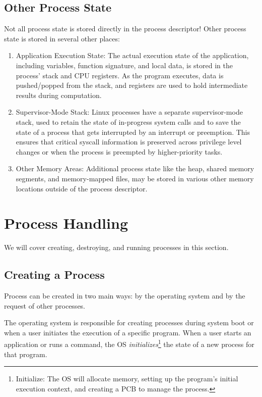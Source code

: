 \documentclass{report}
\begin{document}
\section{Other Process State}
Not all process state is stored directly in the process descriptor! Other process state is stored in
several other places:
\begin{enumerate}[label=\textit{(\roman*)}]
\item Application Execution State: The actual execution state of the application, including
  variables, function signature, and local data, is stored in the process' stack and CPU
  registers. As the program executes, data is pushed/popped from the stack, and registers are used
  to hold intermediate results during computation.
\item Supervisor-Mode Stack: Linux processes have a separate supervisor-mode stack, used to retain
  the state of in-progress system calls and to save the state of a process that gets interrupted
  by an interrupt or preemption. This ensures that critical syscall information is preserved
  across privilege level changes or when the process is preempted by higher-priority tasks.
\item Other Memory Areas: Additional process state like the heap, shared memory segments, and
  memory-mapped files, may be stored in various other memory locations outside of the process
  descriptor.
\end{enumerate}


\chapter{Process Handling}
We will cover creating, destroying, and running processes in this section.

\section{Creating a Process}
Process can be created in two main ways: by the operating system and by the request of other
processes.

The operating system is responsible for creating processes during system boot or when a user
initiates the execution of a specific program. When a user starts an application or runs a command,
the OS \textit{initializes}\footnote{Initialize: The OS will allocate memory, setting up the program's
  initial execution context, and creating a PCB to manage the process.} the state of a new process
for that program. 
\end{document}

